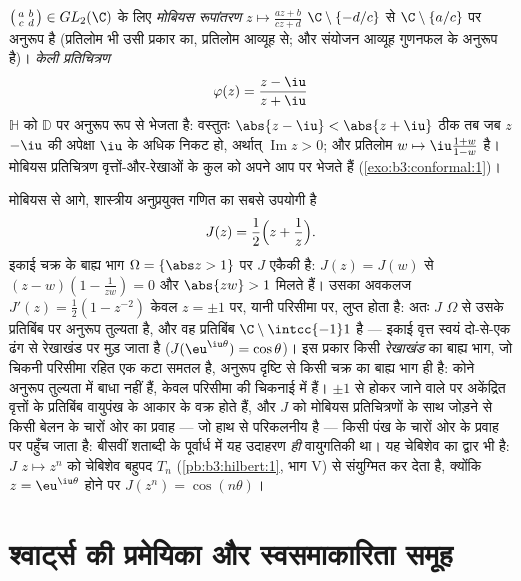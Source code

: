 \begin{example}[मोबियस रूपांतरण]
\label{ex:b3:conformal:mobius}
$\bigl(\begin{smallmatrix}a & b\\ c &
d\end{smallmatrix}\bigr) \in GL_2(\C)$ के लिए \emph{मोबियस रूपांतरण} $z \mapsto
\frac{az + b}{cz + d}$
$\C\setminus\{-d/c\}$ से $\C\setminus\{a/c\}$ पर अनुरूप है (प्रतिलोम भी उसी प्रकार का, प्रतिलोम
आव्यूह से; और संयोजन आव्यूह गुणनफल के अनुरूप है)। \emph{केली
प्रतिचित्रण}
\[
\varphi(z) = \frac{z - \iu}{z + \iu}
\]
$\mathbb H$ को $\mathbb D$ पर अनुरूप रूप से भेजता है: वस्तुतः $\abs{z
- \iu} < \abs{z + \iu}$ ठीक तब जब
$z$ $-\iu$ की अपेक्षा $\iu$ के अधिक निकट हो, अर्थात् $\operatorname{Im}z > 0$; और
प्रतिलोम $w \mapsto \iu\frac{1 + w}{1 - w}$ है। मोबियस प्रतिचित्रण वृत्तों-और-रेखाओं के कुल को
अपने आप पर भेजते हैं (\cref{exo:b3:conformal:1})।
\end{example}

\begin{example}[ज़ूकोव्स्की प्रतिचित्रण]\label{ex:b3:conformal:joukowski}
मोबियस से आगे, शास्त्रीय अनुप्रयुक्त गणित का सबसे उपयोगी  है
\[
J(z) = \frac12\Bigl(z + \frac1z\Bigr) .
\]
इकाई चक्र के बाह्य भाग $\Omega = \{\abs z > 1\}$ पर $J$ एकैकी है: $J(z) = J(w)$ से $(z - w)(1 -
\frac1{zw}) = 0$ और
$\abs{zw} > 1$ मिलते हैं। उसका अवकलज $J'(z) =
\frac12(1 - z^{-2})$ केवल $z = \pm1$ पर, यानी परिसीमा पर,
लुप्त होता है: अतः $J$ $\Omega$ से उसके प्रतिबिंब पर अनुरूप तुल्यता
है, और वह प्रतिबिंब $\C\setminus\intcc{-1}1$ है --- इकाई वृत्त स्वयं दो-से-एक ढंग से
रेखाखंड पर मुड़ जाता है ($J(\eu^{\iu\theta}) = \cos\theta$)। इस प्रकार किसी \emph{रेखाखंड} का
बाह्य भाग, जो चिकनी परिसीमा रहित एक कटा समतल है, अनुरूप दृष्टि से
किसी चक्र का बाह्य भाग ही है: कोने अनुरूप तुल्यता में बाधा नहीं
हैं, केवल परिसीमा की चिकनाई में हैं। $\pm1$ से होकर जाने वाले पर
अकेंद्रित वृत्तों के प्रतिबिंब वायुपंख के आकार के वक्र होते हैं,
और $J$ को मोबियस प्रतिचित्रणों के साथ जोड़ने से किसी बेलन के
चारों ओर का प्रवाह --- जो हाथ से परिकलनीय है --- किसी पंख के
चारों ओर के प्रवाह पर पहुँच जाता है: बीसवीं शताब्दी के पूर्वार्ध
में यह उदाहरण \emph{ही} वायुगतिकी था। यह चेबिशेव का द्वार भी है:
$J$ $z \mapsto z^n$ को चेबिशेव बहुपद $T_n$ (\cref{pb:b3:hilbert:1}, भाग V) से संयुग्मित कर
देता है, क्योंकि $z = \eu^{\iu\theta}$ होने पर $J(z^n) = \cos(n\theta)$।
\end{example}

\section{श्वार्ट्स की प्रमेयिका और स्वसमाकारिता समूह}

